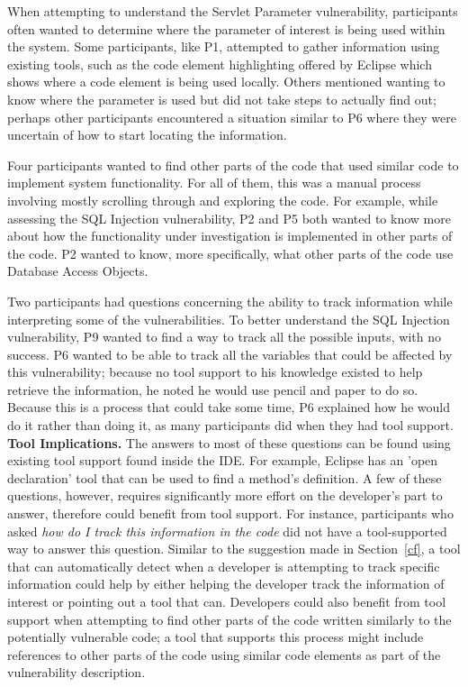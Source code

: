 \documentclass[conference]{IEEEtran}
\begin{document}
When attempting to understand the Servlet Parameter vulnerability, participants often wanted to determine where the parameter of interest is being used within the system. 
Some participants, like P1, attempted to gather information using existing tools, such as the code element highlighting offered by Eclipse which shows where a code element is being used locally. 
Others mentioned wanting to know where the parameter is used but did not take steps to actually find out; perhaps other participants encountered a situation similar to P6 where they were uncertain of how to start locating the information.

Four participants wanted to find other parts of the code that used similar code to implement system functionality.
For all of them, this was a manual process involving mostly scrolling through and exploring the code. 
For example, while assessing the SQL Injection vulnerability, P2 and P5 both wanted to know more about how the functionality under investigation is implemented in other parts of the code. 
P2 wanted to know, more specifically, what other parts of the code use Database Access Objects.

Two participants had questions concerning the ability to track information while interpreting some of the vulnerabilities. 
To better understand the SQL Injection vulnerability, P9 wanted to find a way to track all the possible inputs, with no success. 
P6 wanted to be able to track all the variables that could be affected by this vulnerability; because no tool support to his knowledge existed to help retrieve the information, he noted he would use pencil and paper to do so. 
Because this is a process that could take some time, P6 explained how he would do it rather than doing it, as many participants did when they had tool support.
\\

\noindent\textbf{Tool Implications.}
The answers to most of these questions can be found using existing tool support found inside the IDE. 
For example, Eclipse has an 'open declaration' tool that can be used to find a method's definition. 
A few of these questions, however, requires significantly more effort on the developer's part to answer, therefore could benefit from tool support. 
For instance, participants who asked \textit{how do I track this information in the code} did not have a tool-supported way to answer this question.
Similar to the suggestion made in Section~\ref{cf}, a tool that can automatically detect when a developer is attempting to track specific information could help by either helping the developer track the information of interest or pointing out a tool that can.
Developers could also benefit from tool support when attempting to find other parts of the code written similarly to the potentially vulnerable code; a tool that supports this process might include references to other parts of the code using similar code elements as part of the vulnerability description.
\end{document}
